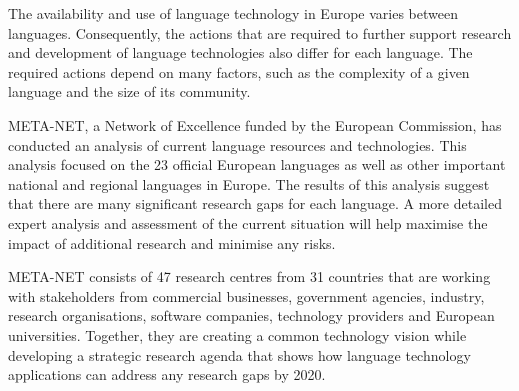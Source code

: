 \documentclass[]{../../metanetpaper}
\begin{document}
\begin{Parallel}[c]{77mm}{77mm}
{The availability and use of language technology in Europe varies between
languages. Consequently, the actions that are required to further support
research and development of language technologies also differ for each
language. The required actions depend on many factors, such as the complexity
of a given language and the size of its community.

META-NET, a Network of Excellence funded by the European Commission, has
conducted an analysis of current language resources and technologies. This
analysis focused on the 23 official European languages as well as other
important national and regional languages in Europe. The results of this
analysis suggest that there are many significant research gaps for each
language. A more detailed expert analysis and assessment of the current
situation will help maximise the impact of additional research and minimise any
risks.

META-NET consists of 47 research centres from 31 countries that are working
with stakeholders from commercial businesses, government agencies, industry,
research organisations, software companies, technology providers and European
universities. Together, they are creating a common technology vision while
developing a strategic research agenda that shows how language technology
applications can address any research gaps by 2020.
}

\ParallelPar


  \clearpage
  \tableofcontents
  \clearpage


\clearpage



\end{Parallel}
\end{document}
